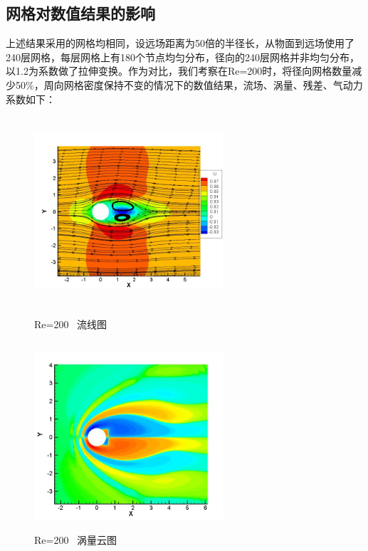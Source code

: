 \documentclass[UTF8]{ctexart}
\begin{document}
\subsection{网格对数值结果的影响}
上述结果采用的网格均相同，设远场距离为50倍的半径长，从物面到远场使用了240层网格，每层网格上有180个节点均匀分布，径向的240层网格并非均匀分布，以1.2为系数做了拉伸变换。作为对比，我们考察在Re=200时，将径向网格数量减少50\%，周向网格密度保持不变的情况下的数值结果，流场、涡量、残差、气动力系数如下：
\begin{figure}[htbp]\centering
\begin{minipage}{7cm}
\includegraphics[height=7cm,width=7cm]{../pic/Streamline_Contrast.JPG}
\caption{Re=200 \ 流线图}
\end{minipage}
\begin{minipage}{7cm}
\includegraphics[height=7cm,width=7cm]{../pic/Vorticity_Contrast.JPG}
\caption{Re=200 \ 涡量云图}
\end{minipage}


\end{figure}
\end{document}
